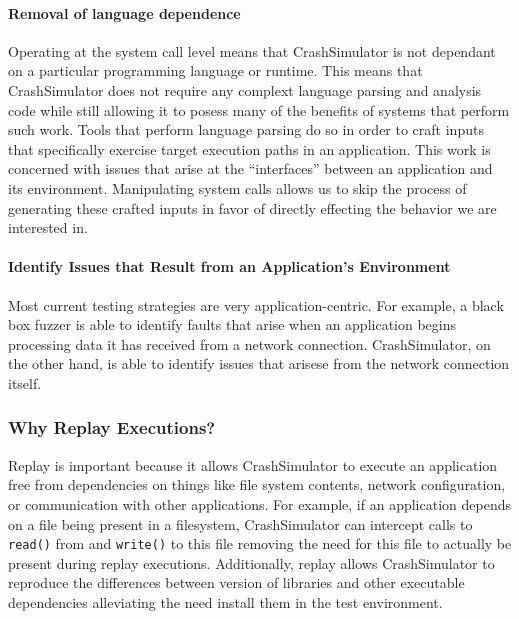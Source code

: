         \paragraph{Removal of language dependence}

        Operating at the system call level means that CrashSimulator is not
        dependant on a particular programming language or runtime.  This means
        that CrashSimulator does not require any complext language parsing and
        analysis code while still allowing it to posess many of the benefits of
        systems that perform such work.  Tools that perform language parsing do
        so in order to craft inputs that specifically exercise target execution
        paths in an application.  This work is concerned with issues that arise
        at the ``interfaces'' between an application and its environment.
        Manipulating system calls allows us to skip the process of generating
        these crafted inputs in favor of directly effecting the behavior we are
        interested in.

        \paragraph{Identify Issues that Result from an Application's Environment}

        Most current testing strategies are very application-centric.  For
        example, a black box fuzzer is able to identify faults that arise when
        an application begins processing data it has received from a network
        connection. CrashSimulator, on the other hand, is able to identify
        issues that arisese from the network connection itself.

    \subsubsection{Why Replay Executions?}

        Replay is important because it allows CrashSimulator to execute an
        application free from dependencies on things like file system contents,
        network configuration, or communication with other applications.  For
        example, if an application depends on a file being present in a filesystem,
        CrashSimulator can intercept calls to {\tt read()} from and {\tt write()} to
        this file removing the need for this file to actually be present during
        replay executions. Additionally, replay allows CrashSimulator to reproduce
        the differences between version of libraries and other executable
        dependencies alleviating the need install them in the test environment.

